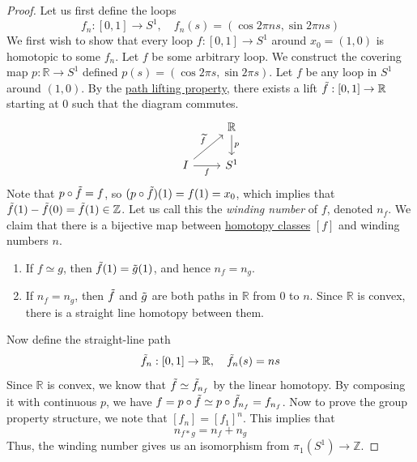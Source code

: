 	\begin{proof}
		Let us first define the loops 
		\begin{equation}
		  f_n: [0, 1] \to S^1, \quad f_n(s) = ( \cos{2\pi ns}, \sin{2\pi ns} )
		\end{equation}
		We first wish to show that every loop $f: [0, 1] \to S^1$ around $x_0 = (1, 0)$ is homotopic to some $f_n$. Let $f$ be some arbitrary loop. We construct the covering map $p: \mathbb{R} \to S^1$ defined $p(s) = (\cos{2\pi s}, \sin{2\pi s} )$. Let $f$ be any loop in $S^1$ around $(1, 0)$. By the \hyperref[thm:path-lifting-property]{path lifting property}, there exists a lift $\Tilde{f}: [0, 1] \to \mathbb{R}$ starting at $0$ such that the diagram commutes. 
		\begin{equation}
			\begin{tikzcd}
				& \mathbb{R} \arrow[d, "p"] \\
				I \arrow[ru, "\widetilde{f}"] \arrow[r, "f"'] &	S^1
			\end{tikzcd}
		\end{equation}
		Note that $p \circ \Tilde{f} = f$, so $(p \circ \Tilde{f})(1) = f(1) = x_0$, which implies that $\Tilde{f}(1) - \Tilde{f}(0) = \Tilde{f}(1) \in \mathbb{Z}$. Let us call this the \textit{winding number} of $f$, denoted $n_f$. We claim that there is a bijective map between \hyperref[def:homotopy-class]{homotopy classes} $[f]$ and winding numbers $n$. 
		\begin{enumerate}
		  \item If $f \simeq g$, then $\Tilde{f}(1) = \Tilde{g}(1)$, and hence $n_f = n_g$. 
			\item If $n_f = n_g$, then $\Tilde{f}$ and $\Tilde{g}$ are both paths in $\mathbb{R}$ from $0$ to $n$. Since $\mathbb{R}$ is convex, there is a straight line homotopy between them. 
		\end{enumerate}
		Now define the straight-line path  
		\begin{equation}
			\Tilde{f}_n : [0, 1] \to \mathbb{R}, \quad \Tilde{f}_n (s) = ns
		\end{equation}
		Since $\mathbb{R}$ is convex, we know that $\Tilde{f} \simeq \Tilde{f}_{n_f}$ by the linear homotopy. By composing it with continuous $p$, we have $f = p \circ \Tilde{f} \simeq p \circ \Tilde{f}_{n_f} = f_{n_f}$. Now to prove the group property structure, we note that $[f_n] = [f_1]^n$. This implies that 
		\begin{equation}
			n_{f \ast g} = n_f + n_g
		\end{equation}
		Thus, the winding number gives us an isomorphism from $\pi_1 (S^1) \to \mathbb{Z}$. 
	\end{proof}


